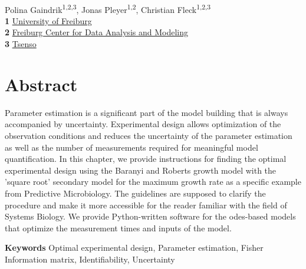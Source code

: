 \documentclass[10pt,A4paper]{article}
\providecommand{\keywords}[1]{\textbf{Keywords } #1}
\begin{document}
\vspace*{0.2in}
\begin{flushleft}
{\Large
\textbf{}}
\newline
\\
Polina Gaindrik\textsuperscript{1,2,3},
Jonas Pleyer\textsuperscript{1,2},
Christian Fleck\textsuperscript{1,2,3}
\\
\bigskip
\textbf{1} \href{https://www.fdm.uni-freiburg.de/spatsysbio}{University of Freiburg}\\
\textbf{2} \href{https://www.fdm.uni-freiburg.de/spatsysbio}{Freiburg Center for Data Analysis and Modeling}\\
\textbf{3} \href{https://tsenso.com/en/}{Tsenso}\\
\bigskip

\end{flushleft}
\section*{Abstract}
\linenumbers
Parameter estimation is a significant part of the model building that is always accompanied by uncertainty.
Experimental design allows optimization of the observation conditions and reduces the uncertainty of the parameter estimation as well as the number of measurements required for meaningful model quantification.
In this chapter, we provide instructions for finding the optimal experimental design using the Baranyi and Roberts growth model with the 'square root' secondary model for the maximum growth rate as a specific example from Predictive Microbiology. 
The guidelines are supposed to clarify the procedure and make it more accessible for the reader familiar with the field of Systems Biology.
We provide Python-written software for the \acp{ode}-based models that optimize the measurement times and inputs of the model.


\keywords{Optimal experimental design, Parameter estimation, Fisher Information matrix, Identifiability, Uncertainty}

%
%
%
\end{document}
